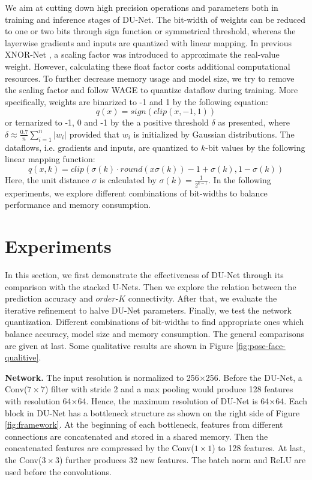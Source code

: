 \documentclass[runningheads]{llncs}
\begin{document}
We aim at cutting down high precision operations and parameters both in training and inference stages of DU-Net. The bit-width of weights can be reduced to one or two bits through sign function or symmetrical threshold, whereas the layerwise gradients and inputs are quantized with linear mapping. In previous XNOR-Net \cite{rastegari2016xnor}, a scaling factor was introduced to approximate the real-value weight. However, calculating these float factor costs additional computational resources. To further decrease memory usage and model size, we try to remove the scaling factor and follow WAGE \cite{wu2018training} to quantize dataflow during training. More specifically, weights are binarized to -1 and 1 by the following equation:
\begin{equation} \label{eq:sign}
q(x) = sign(clip(x,-1,1))
\end{equation} 
or ternarized to -1, 0 and -1 by the a positive threshold $\delta$ as \cite{li2016ternary} presented, where $\delta \approx \frac{0.7}{n}\sum_{i=1}^{n} \left | w_i \right |$ provided that $w_i$ is initialized by Gaussian distributions. The dataflows, i.e. gradients and inputs, are quantized to $k$-bit values by the following linear mapping function:
\begin{equation} \label{eq:sign}
q(x,k) = clip(\sigma(k)\cdot  round(x\sigma(k)) -1+\sigma(k),1-\sigma(k))
\end{equation} 
Here, the unit distance $\sigma$ is calculated by $\sigma(k) = \frac{1}{2^{k-1}}$. In the following experiments, we explore different combinations of bit-widths to balance performance and memory consumption.
 
\section{Experiments}

In this section, we first demonstrate the effectiveness of DU-Net through its comparison with the stacked U-Nets. Then we explore the relation between the prediction accuracy and $order$-$K$ connectivity. After that, we evaluate the iterative refinement to halve DU-Net parameters. Finally, we test the network quantization. Different combinations of bit-widths to find appropriate ones which balance accuracy, model size and memory consumption. The general comparisons are given at last. Some qualitative results are shown in Figure \ref{fig:pose-face-qualitive}.

{\bf Network.} The input resolution is normalized to 256$\times$256. Before the DU-Net, a Conv($7\times 7$) filter with stride 2 and a max pooling would produce 128 features with resolution 64$\times$64. Hence, the maximum resolution of DU-Net is 64$\times$64. Each block in DU-Net has a bottleneck structure as shown on the right side of Figure \ref{fig:framework}. At the beginning of each bottleneck, features from different connections are concatenated and stored in a shared memory. Then the concatenated features are compressed by the Conv($1\times 1$) to 128 features. At last, the Conv($3\times 3$) further produces 32 new features. The batch norm and ReLU are used before the convolutions. 
\end{document}
